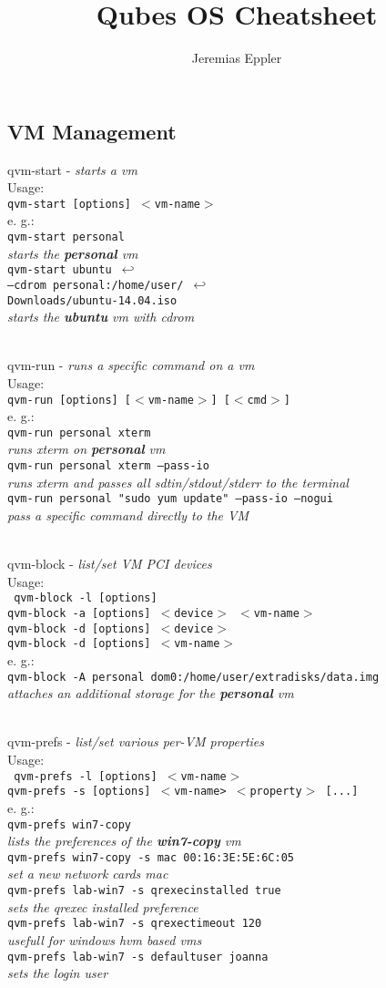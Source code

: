 \documentclass[10pt,a4paper,landscape,twocolumn]{scrartcl}
\title{Qubes OS Cheatsheet}
\author{Jeremias Eppler}
\newcommand{\desc}[2]{\noindent #1 - \textit{#2} \\}
\newcommand{\usage}[1]{ Usage: \\ \texttt{#1} \\}
\newenvironment{examplebox}{e. g.: \\}{}
\newcommand{\example}[2]{\texttt{#1} \\ \textit{#2} \\}
\newcommand{\vm}[1]{\textbf{#1} vm}
\newenvironment{cmdblock}{}{\\}
\newcommand{\n}{$\hookleftarrow$ \\ }
\begin{document}
\maketitle
\subsection*{VM Management}
\begin{cmdblock}
	\desc{qvm-start}{starts a vm}
	\usage{qvm-start [options] $<$vm-name$>$}
	\begin{examplebox}
		\example{qvm-start personal}{starts the \vm{personal}}
		\example{qvm-start ubuntu \n --cdrom personal:/home/user/ \n Downloads/ubuntu-14.04.iso}{starts the \vm{ubuntu} with cdrom}
	\end{examplebox}
\end{cmdblock}

\begin{cmdblock}
	\desc{qvm-run}{runs a specific command on a vm}
	\usage{qvm-run [options] [$<$vm-name$>$] [$<$cmd$>$]}
	\begin{examplebox}
		\example{qvm-run personal xterm}{runs xterm on \vm{personal}}
		\example{qvm-run personal xterm --pass-io}{runs xterm and passes all sdtin/stdout/stderr to the terminal}
		\example{qvm-run personal "sudo yum update" --pass-io --nogui}{pass a specific command directly to the VM}
	\end{examplebox}
\end{cmdblock}

\begin{cmdblock}
	\desc{qvm-block}{list/set VM PCI devices}
	\usage{
		qvm-block -l [options]\\
		qvm-block -a [options] $<$device$>$ $<$vm-name$>$\\
		qvm-block -d [options] $<$device$>$\\
		qvm-block -d [options] $<$vm-name$>$
	}
	\begin{examplebox}
		\example{qvm-block -A personal dom0:/home/user/extradisks/data.img}{attaches an additional storage for the \vm{personal} }
	\end{examplebox}
\end{cmdblock}

\begin{cmdblock}
	\desc{qvm-prefs}{list/set various per-VM properties}
	\usage{
		qvm-prefs -l [options] $<$vm-name$>$\\
		qvm-prefs -s [options] $<$vm-name> $<$property$>$ [...]
	}
	\begin{examplebox}
		\example{qvm-prefs win7-copy}{lists the preferences of the \vm{win7-copy} }
		\example{qvm-prefs win7-copy -s mac 00:16:3E:5E:6C:05}{set a new network cards mac}
		\example{qvm-prefs lab-win7 -s qrexec\textunderscore installed true}{sets the qrexec installed preference}
		\example{qvm-prefs lab-win7 -s qrexec\textunderscore timeout 120}{usefull for windows hvm based vms}
		\example{qvm-prefs lab-win7 -s default\textunderscore user joanna}{sets the login user}
	\end{examplebox}
\end{cmdblock}
\end{document}
